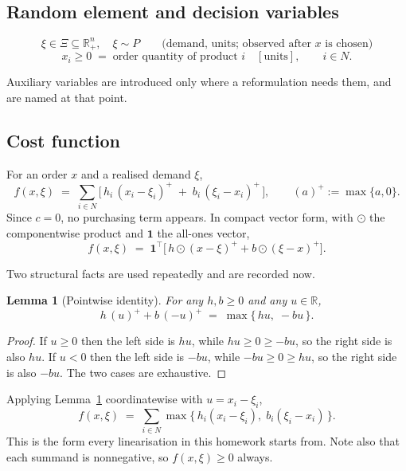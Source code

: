 \documentclass[11pt]{article}
\newtheorem{lemma}{Lemma}
\theoremstyle{definition}
\begin{document}
\subsection*{Random element and decision variables}

\[
  \xi \in \Xi \subseteq \mathbb{R}^n_+ ,\quad \xi \sim P
  \qquad\text{(demand, units; observed after $x$ is chosen)}
\]
\[
  x_i \ge 0 \;=\; \text{order quantity of product } i \quad [\text{units}],
  \qquad i \in N .
\]

Auxiliary variables are introduced only where a reformulation needs them,
and are named at that point.

\subsection*{Cost function}

For an order $x$ and a realised demand $\xi$,
\begin{equation}
  f(x,\xi) \;=\; \sum_{i \in N}
    \Big[\, h_i\,(x_i - \xi_i)^{+} \;+\; b_i\,(\xi_i - x_i)^{+} \,\Big],
  \qquad (a)^{+} := \max\{a,0\}.
  \label{eq:cost}
\end{equation}
Since $c = 0$, no purchasing term appears. In compact vector form, with
$\odot$ the componentwise product and $\mathbf{1}$ the all-ones vector,
\[
  f(x,\xi) \;=\; \mathbf{1}^{\!\top}
    \Big[\, h \odot (x-\xi)^{+} + b \odot (\xi-x)^{+} \Big].
\]

Two structural facts are used repeatedly and are recorded now.

\begin{lemma}[Pointwise identity]
\label{lem:identity}
For any $h,b \ge 0$ and any $u \in \mathbb{R}$,
\[
  h\,(u)^{+} + b\,(-u)^{+} \;=\; \max\{\,h u,\; -b u\,\}.
\]
\end{lemma}

\begin{proof}
If $u \ge 0$ then the left side is $hu$, while $hu \ge 0 \ge -bu$, so the
right side is also $hu$. If $u < 0$ then the left side is $-bu$, while
$-bu \ge 0 \ge hu$, so the right side is also $-bu$. The two cases are
exhaustive.
\end{proof}

Applying Lemma~\ref{lem:identity} coordinatewise with $u = x_i - \xi_i$,
\begin{equation}
  f(x,\xi) \;=\; \sum_{i \in N}
    \max\big\{\, h_i (x_i - \xi_i),\; b_i(\xi_i - x_i) \,\big\}.
  \label{eq:costmax}
\end{equation}
This is the form every linearisation in this homework starts from. Note
also that each summand is nonnegative, so $f(x,\xi) \ge 0$ always.
\end{document}
